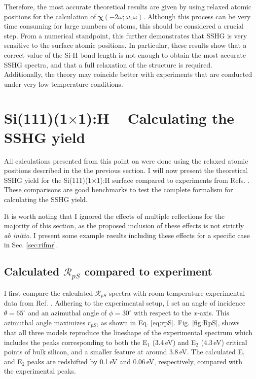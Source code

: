 Therefore, the most accurate theoretical results are given by using relaxed
atomic positions for the calculation of
$\boldsymbol{\chi}(-2\omega;\omega,\omega)$. Although this process can be very
time consuming for large numbers of atoms, this should be considered a crucial
step. From a numerical standpoint, this further demonstrates that SSHG is very
sensitive to the surface atomic positions. In particular, these results show
that a correct value of the Si-H bond length is not enough to obtain the most
accurate SSHG spectra, and that a full relaxation of the structure is required.
Additionally, the theory may coincide better with experiments that are conducted
under very low temperature conditions.



\section{\texorpdfstring{Si(111)(1$\times$1):H}{Si(111)(1x1):H} -- Calculating 
the SSHG yield}

All calculations presented from this point on were done using the relaxed atomic
positions described in the the previous section. I will now present the
theoretical SSHG yield for the Si(111)(1$\times$1):H surface compared to
experiments from Refs. \cite{mitchellSS01, mejiaPRB02, bergfeldPRL04}. These
comparisons are good benchmarks to test the complete formalism for calculating
the SSHG yield.

It is worth noting that I ignored the effects of multiple reflections for the
majority of this section, as the proposed inclusion of these effects is not
strictly \emph{ab initio}. I present some example results including these
effects for a specific case in Sec. \ref{sec:rifmr}.



\subsection{Calculated \texorpdfstring{$\mathcal{R}_{pS}$}{RpS} compared to 
experiment}\label{sec: RpS}

I first compare the calculated $\mathcal{R}_{pS}$ spectra with room temperature
experimental data from Ref. \cite{mejiaPRB02}. Adhering to the experimental
setup, I set an angle of incidence $\theta=65^{\circ}$ and an azimuthal angle of
$\phi=30^\circ$ with respect to the $x$-axis. This azimuthal angle maximizes
$r_{pS}$, as shown in Eq. \eqref{eq:rpS}. Fig. \ref{fig:RpS}, shows that all
three models reproduce the lineshape of the experimental spectrum which includes
the peaks corresponding to both the E$_{1}$ (3.4\,eV) and E$_{2}$ (4.3\,eV)
critical points of bulk silicon, and a smaller feature at around 3.8\,eV. The
calculated E$_{1}$ and E$_{2}$ peaks are redshifted by 0.1\,eV and 0.06\,eV,
respectively, compared with the experimental peaks.

